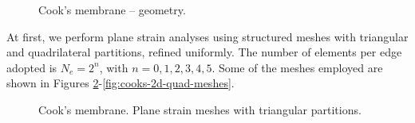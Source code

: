 \documentclass[english,11pt,3p,number,sort&compress]{elsarticle}
\begin{document}
\begin{figure}[H]
    \centering
    
    \caption{Cook's membrane -- geometry.}
    \label{fig:cooks-geometry}
\end{figure}

At first, we perform plane strain analyses using structured meshes with triangular and quadrilateral partitions, refined uniformly. The number of elements per edge adopted is $N_e=2^n$, with $n={0,1,2,3,4,5}$. Some of the meshes employed are shown in Figures \ref{fig:cooks-2d-tri-meshes}-\ref{fig:cooks-2d-quad-meshes}.

\begin{figure}[H]
	\centering
	\caption{Cook's membrane. Plane strain meshes with triangular partitions.}
	\label{fig:cooks-2d-tri-meshes}
\end{figure}
\end{document}
